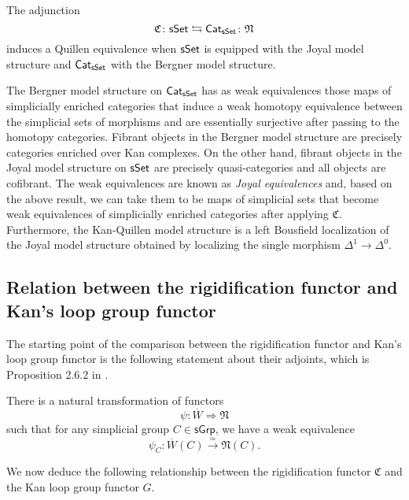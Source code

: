 \begin{theorem} \label{joyalbergner} The adjunction $$ \mathfrak{C} \colon \mathsf{sSet} \leftrightarrows \mathsf{Cat}_{\mathsf{sSet}} \colon \mathfrak{N}$$ induces a Quillen equivalence when $\mathsf{sSet}$ is equipped with the Joyal model structure and $\mathsf{Cat}_{\mathsf{sSet}}$ with the Bergner model structure.
\end{theorem}


\begin{remark} The Bergner model structure on $\mathsf{Cat}_{\mathsf{sSet}}$ has as weak equivalences those maps of simplicially enriched categories that induce a weak homotopy equivalence between the simplicial sets of morphisms and are essentially surjective after passing to the homotopy categories. Fibrant objects in the Bergner model structure are precisely categories enriched over Kan complexes. On the other hand, fibrant objects in the Joyal model structure on $\mathsf{sSet}$ are precisely quasi-categories and all objects are cofibrant. The weak equivalences are known as \textit{Joyal equivalences} and, based on the above result, we can take them to be maps of simplicial sets that become weak equivalences of simplicially enriched categories after applying $\mathfrak{C}$. Furthermore, the Kan-Quillen model structure is a left Bousfield localization of the Joyal model structure obtained by localizing the single morphism $\Delta^1 \to \Delta^0.$

\end{remark}


\subsection{Relation between the rigidification functor and Kan's loop group functor}

The starting point of the comparison between the rigidification functor and Kan's loop group functor is the following statement about their adjoints, which is Proposition 2.6.2 in \cite{hinich2007deformation}.

\begin{proposition}\label{hinich}
There is a natural transformation of functors $$\psi: \overline{W} \Longrightarrow \mathfrak{N}$$ such that for any simplicial group $C \in \mathsf{sGrp}$, we have a weak equivalence
$$\psi_C: \overline{W}(C) \xrightarrow{\simeq} \mathfrak{N}(C).$$
\end{proposition} 

We now deduce the following relationship between the rigidification functor $\mathfrak{C}$ and the Kan loop group functor $G$.


